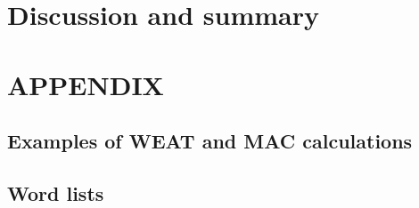\documentclass[
  10pt,
  dvipsnames,enabledeprecatedfontcommands]{scrartcl}
\begin{document}
\hypertarget{discussion-and-summary}{%
\section{Discussion and summary}\label{discussion-and-summary}}

\hypertarget{appendix}{%
\section{APPENDIX}\label{appendix}}

\hypertarget{examples-of-weat-and-mac-calculations}{%
\subsection{Examples of WEAT and MAC
calculations}\label{examples-of-weat-and-mac-calculations}}

\hypertarget{word-lists}{%
\subsection*{Word lists}\label{word-lists}}
\end{document}
